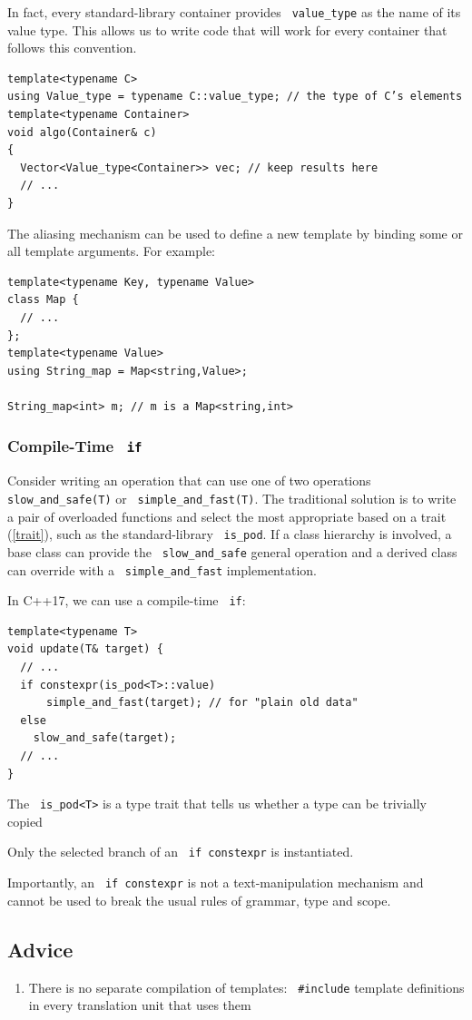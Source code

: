 \documentclass[11pt]{article}
\let\OldTexttt\texttt
\renewcommand{\texttt}[1]{\OldTexttt{\color{MidnightBlue} #1}}
\begin{document}
In fact, every standard-library container provides \texttt{value\_type} as the name of its value type.
This allows us to write code that will work for every container that follows this convention.

\begin{verbatim}
template<typename C>
using Value_type = typename C::value_type; // the type of C’s elements
template<typename Container>
void algo(Container& c)
{
  Vector<Value_type<Container>> vec; // keep results here
  // ...
}
\end{verbatim}
The aliasing mechanism can be used to define a new template by binding some or all template
arguments. For example:

\begin{verbatim}
template<typename Key, typename Value>
class Map {
  // ...
};
template<typename Value>
using String_map = Map<string,Value>;

String_map<int> m; // m is a Map<string,int>
\end{verbatim}
\subsubsection{Compile-Time \texttt{if}}
\label{sec:org6bd92eb}
Consider writing an operation that can use one of two operations \texttt{slow\_and\_safe(T)} or
\texttt{simple\_and\_fast(T)}. The traditional solution is to write a pair of overloaded functions and
select the most appropriate based on a trait (\ref{trait}), such as the standard-library \texttt{is\_pod}.
If a class hierarchy is involved, a base class can provide the \texttt{slow\_and\_safe} general operation
and a derived class can override with a \texttt{simple\_and\_fast} implementation.

In C++17, we can use a compile-time \texttt{if}:
\begin{verbatim}
template<typename T>
void update(T& target) {
  // ...
  if constexpr(is_pod<T>::value)
      simple_and_fast(target); // for "plain old data"
  else
    slow_and_safe(target);
  // ...
}
\end{verbatim}
The \texttt{is\_pod<T>} is a type trait that tells us whether a type can be trivially copied

Only the selected branch of an \texttt{if constexpr} is instantiated.

Importantly, an \texttt{if constexpr} is not a text-manipulation mechanism and cannot be used to break
the usual rules of grammar, type and scope.
\subsection{Advice}
\label{sec:org16f86f8}
\begin{enumerate}
\item There is no separate compilation of templates: \texttt{\#include} template definitions in every
translation unit that uses them
\end{enumerate}
\end{document}
